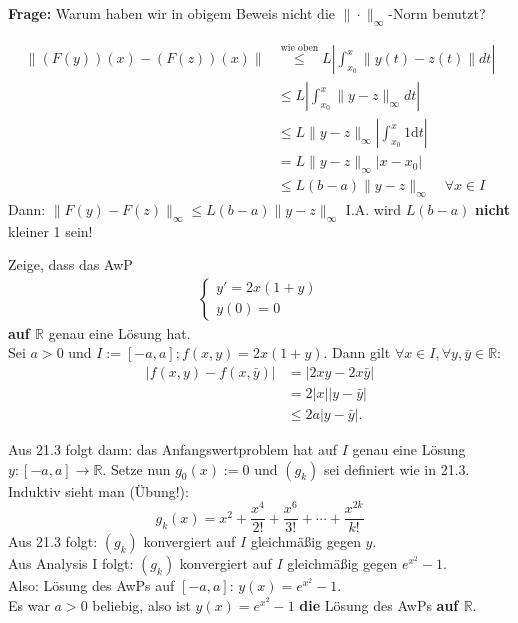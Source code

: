 \documentclass[a4paper,twoside,DIV15,BCOR12mm,chapterprefix=true,headings=twolinechapter]{scrbook}
\begin{document}
\textbf{Frage: } Warum haben wir in obigem Beweis nicht die $\|\cdot \|_\infty$-Norm benutzt?

\begin{align*}
\|(F(y))(x) -(F(z))(x)\| &\stackrel{\text{wie oben}}\leq L \left| \int_{x_0}^x \|y(t)-z(t)\| dt \right| \\
&\leq L \left| \int_{x_0}^x \|y-z\|_\infty dt \right| \\
&\leq L \|y-z\|_\infty \left| \int_{x_0}^x 1 \text{d}t \right|\\
&= L \|y-z\|_\infty |x-x_0|\\
&\leq L(b-a) \|y-z\|_\infty \quad \forall x \in I
\end{align*}
Dann:  $\|F(y)-F(z)\|_\infty \leq L(b-a)\|y-z\|_\infty$
I.A. wird $L(b-a)$ \textbf{nicht} kleiner 1 sein!


\begin{beispiel}[zu 21.3]
Zeige, dass das AwP
\begin{align*} \begin{cases}
y' = 2x(1+y)\\
y(0) =  0
\end{cases} \end{align*}
\textbf{auf $\mathbb{R}$} genau eine Lösung hat.\\
Sei $a > 0$ und $I := [-a, a]; f(x,y) = 2x(1+y).$ Dann gilt $\forall x \in I, \forall y, \bar y \in \mathbb{R}:$
\begin{align*}
|f(x,y)-f(x, \bar y )|&= |2xy-2x\bar y | \\
&= 2|x||y-\bar y | \\
&\leq 2a|y-\bar y |.
\end{align*}

Aus 21.3 folgt dann: das Anfangswertproblem hat auf $I$ genau eine Lösung $y: [-a, a] \to \mathbb{R}$. 
Setze nun $g_0(x) :=0$ und $(g_k)$  sei definiert wie in 21.3.
Induktiv sieht man (Übung!):
\[g_k(x) = x^2 + \frac{x^4}{2!} + \frac{x^6}{3!} + \cdots + \frac{x^{2k}}{k!} \]
Aus 21.3 folgt: $(g_k)$ konvergiert auf $I$ gleichmäßig gegen $y$.\\
Aus Analysis I folgt: $(g_k)$ konvergiert auf $I$ gleichmäßig gegen $e^{x^2} - 1$.\\
Also: Lösung des AwPs auf $[-a,a]$: $y(x) = e^{x^2} -1$.\\
Es war $a > 0$ beliebig, also ist $y(x) = e^{x^2} -1$ \textbf{die} Lösung des AwPs \textbf{auf $\mathbb{R}$}.
\end{beispiel}
\end{document}
